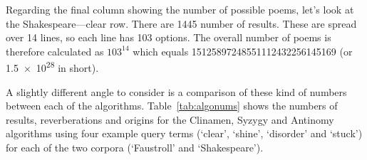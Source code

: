 Regarding the final column showing the number of possible poems, let's look at the Shakespeare---clear row. There are \num{1445} number of results. These are spread over \num{14} lines, so each line has \num{103} options. The overall number of poems is therefore calculated as $103^{14}$ which equals \num{15125897248551112432256145169} (or \num{1.5e28} in short).

\spirals

A slightly different angle to consider is a comparison of these kind of numbers between each of the algorithms. Table~\ref{tab:algonums} shows the numbers of results, reverberations and origins for the Clinamen, Syzygy and Antinomy algorithms using four example query terms (`clear', `shine', `disorder' and `stuck') for each of the two corpora (`Faustroll' and `Shakespeare').

